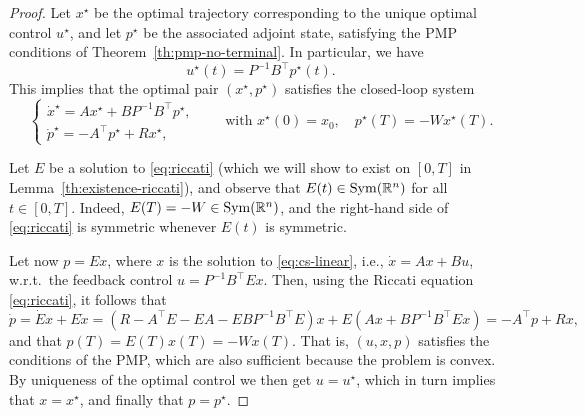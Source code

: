 \begin{proof}
    Let $x^\star$ be the optimal trajectory corresponding to the unique optimal control $u^\star$, and let $p^\star$ be the associated adjoint state, satisfying the PMP conditions of Theorem~\ref{th:pmp-no-terminal}.
    In particular, we have
    \begin{equation}
        \label{eq:u-star-pmp}
        u^\star(t) = P^{-1} B^\top p^\star(t).
    \end{equation}
    This implies that the optimal pair $(x^\star,p^\star)$ satisfies the closed-loop system
    \begin{equation}
        \begin{cases}
            \dot x^\star = A x^\star + B P^{-1} B^\top p^\star, \\
            \dot p^\star = -A^\top p^\star + R x^\star,
        \end{cases}
        \qquad
        \text{with } x^\star(0)=x_0, \quad p^\star(T)=-Wx^\star(T).
    \end{equation}
    
    Let $E$ be a solution to \eqref{eq:riccati} (which we will show to exist on $[0,T]$ in Lemma~\ref{th:existence-riccati}), and observe that $E(t)\in \operatorname{Sym}(\mathbb{R}^n)$ for all $t\in [0,T]$. 
    Indeed, $E(T)=-W\in \operatorname{Sym}(\mathbb{R}^n)$, and the right-hand side of \eqref{eq:riccati} is symmetric whenever $E(t)$ is symmetric.
    
    Let now $p=E x$, where $x$ is the solution to \eqref{eq:cs-linear}, i.e., $\dot x = Ax+Bu$, w.r.t.~the feedback control $u=P^{-1}B^\top E x$.
     Then, using the Riccati equation \eqref{eq:riccati}, it follows that
     \begin{equation}
         \dot p = \dot E x + E \dot x
         = \left( R- A^\top E - E A - E B P^{-1}B^\top E \right)x + E\left( Ax + BP^{-1}B^\top Ex \right)
         = -A^\top p + R x,
     \end{equation}
     and that $p(T) = E(T)x(T) = -Wx(T)$.
     That is, $(u, x, p)$ satisfies the conditions of the PMP, which are also sufficient because the problem is convex. By uniqueness of the optimal control we then get $u=u^\star$, which in turn implies that $x=x^\star$, and  finally that $p=p^\star$.


\end{proof}
